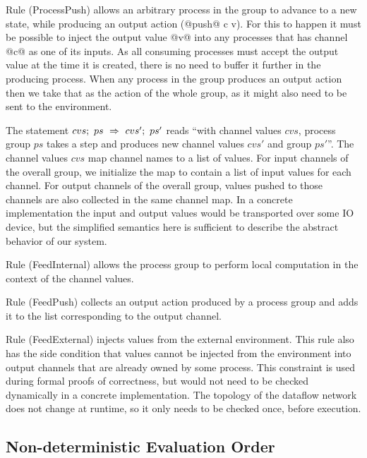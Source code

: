 Rule (ProcessPush) allows an arbitrary process in the group to advance to a new state, while producing an output action (@push@ c v). For this to happen it must be possible to inject the output value @v@ into any processes that has channel @c@ as one of its inputs. As all consuming processes must accept the output value at the time it is created, there is no need to buffer it further in the producing process. When any process in the group produces an output action then we take that as the action of the whole group, as it might also need to be sent to the environment. 

\smallskip
The statement $cvs;~ps~\Rightarrow~cvs';~ps'$ reads ``with channel values $cvs$, process group $ps$ takes a step and produces new channel values $cvs'$ and group $ps'$''. The channel values $cvs$ map channel names to a list of values. For input channels of the overall group, we initialize the map to contain a list of input values for each channel. For output channels of the overall group, values pushed to those channels are also collected in the same channel map. In a concrete implementation the input and output values would be transported over some IO device, but the simplified semantics here is sufficient to describe the abstract behavior of our system.

Rule (FeedInternal) allows the process group to perform local computation in the context of the channel values. 

Rule (FeedPush) collects an output action produced by a process group and adds it to the list corresponding to the output channel.

Rule (FeedExternal) injects values from the external environment. This rule also has the side condition that values cannot be injected from the environment into output channels that are already owned by some process. This constraint is used during formal proofs of correctness, but would not need to be checked dynamically in a concrete implementation. The topology of the dataflow network does not change at runtime, so it only needs to be checked once, before execution.


\subsection{Non-deterministic Evaluation Order}
\label{s:EvaluationOrder}
%
%
%
%
%
%


